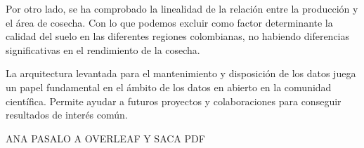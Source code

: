 \documentclass[12pt, spanish]{article}
\begin{document}
Por otro lado, se ha comprobado la linealidad de la relación entre la producción y el área de cosecha. Con lo que podemos excluir como factor determinante la calidad del suelo en las diferentes regiones colombianas, no habiendo diferencias significativas en el rendimiento de la cosecha.

La arquitectura levantada para el mantenimiento y disposición de los datos juega un papel fundamental en el ámbito de los datos en abierto en la comunidad científica. Permite ayudar a futuros proyectos y colaboraciones para conseguir resultados de interés común.



\newpage
ANA PASALO A OVERLEAF Y SACA PDF

\begingroup
	\setlength{\bibsep}{20.0pt}
    
    
\endgroup
\end{document}
